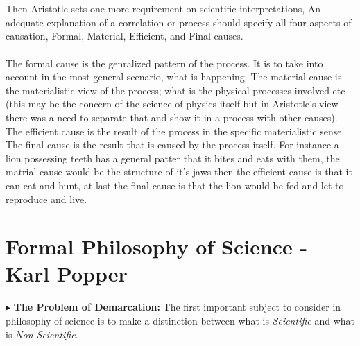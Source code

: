 \documentclass[9pt,a4paper,twocolumn]{article}
\newcommand{\newpoint}[1]{\indent$\blacktriangleright$ \textbf{#1}}
\begin{document}
            \\
            \\
            Then Aristotle sets one more requirement on scientific interpretations, An adequate explanation of a correlation or process should specify all four aspects of causation, Formal, Material, Efficient, and Final causes.
            \\
            \\
            The formal cause is the genralized pattern of the process. It is to take into account in the most general scenario, what is happening. The material cause is the materialistic view of the process; what is the physical processes involved etc (this may be the concern of the science of physics itself but in Aristotle's view there was a need to separate that and show it in a process with other causes). The efficient cause is the result of the process in the specific materialistic sense. The final cause is the result that is caused by the process itself. For instance a lion possessing teeth has a general patter that it bites and eats with them, the matrial cause would be the structure of it's jaws then the efficient cause is that it can eat and hunt, at last the final cause is that the lion would be fed and let to reproduce and live.

            \section{Formal Philosophy of Science - Karl Popper}
            \newpoint{The Problem of Demarcation: }The first important subject to consider in philosophy of science is to make a distinction between what is \textit{Scientific} and what is \textit{Non-Scientific}.
            




        \newpage
        
        
\end{document}
